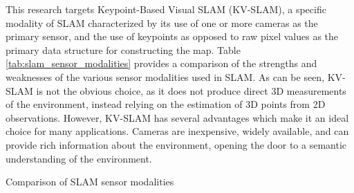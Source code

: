 This research targets Keypoint-Based Visual SLAM (KV-SLAM), a specific modality of SLAM characterized by its use of one or more cameras as the primary sensor, and the use of keypoints as opposed to raw pixel values as the primary data structure for constructing the map. Table \ref{tab:slam_sensor_modalities} provides a comparison of the strengths and weaknesses of the various sensor modalities used in SLAM. As can be seen, KV-SLAM is not the obvious choice, as it does not produce direct 3D measurements of the environment, instead relying on the estimation of 3D points from 2D observations. However, KV-SLAM has several advantages which make it an ideal choice for many applications. Cameras are inexpensive, widely available, and can provide rich information about the environment, opening the door to a semantic understanding of the environment.

\begin{table}[ht!]
    \centering
    \caption{Comparison of SLAM sensor modalities}
    \label{tab:slam_sensor_modalities}
\end{table}